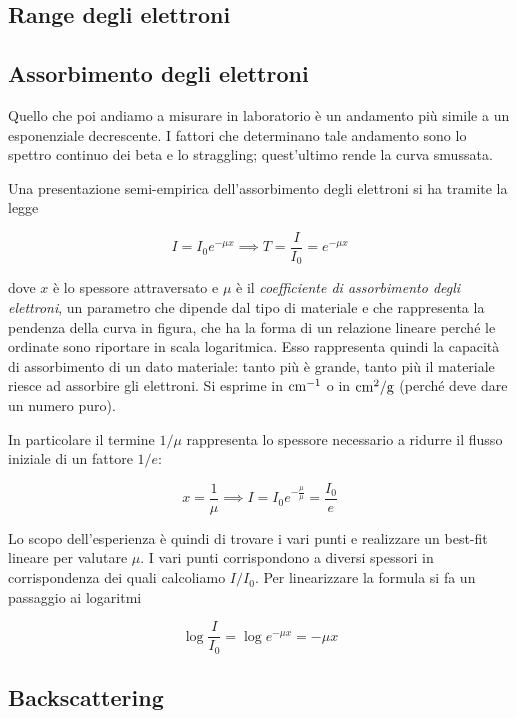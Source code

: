 
\subsection{Range degli elettroni}

\subsection{Assorbimento degli elettroni}
Quello che poi andiamo a misurare in laboratorio è un andamento più simile a un esponenziale decrescente. I fattori che determinano tale andamento sono lo spettro continuo dei beta e lo straggling; quest'ultimo rende la curva smussata.

Una presentazione semi-empirica dell'assorbimento degli elettroni si ha tramite la legge

$$I=I_0 e^{-\mu x}
\implies
T=\frac{I}{I_0}=e^{-\mu x}$$

dove $x$ è lo spessore attraversato e $\mu$ è il \textit{coefficiente di assorbimento degli elettroni}, un parametro che dipende dal tipo di materiale e che rappresenta la pendenza della curva in figura, che ha la forma di un relazione lineare perché le ordinate sono riportare in scala logaritmica. Esso rappresenta quindi la capacità di assorbimento di un dato materiale: tanto più è grande, tanto più il materiale riesce ad assorbire gli elettroni. Si esprime in $\rm cm^{-1}$ o in $\rm cm^2/g$ (perché deve dare un numero puro).

In particolare il termine $1/\mu$ rappresenta lo spessore necessario a ridurre il flusso iniziale di un fattore $1/e$:

$$x=\frac{1}{\mu}
\implies
I=I_0 e^{-\frac{\mu}{\mu}}
=\frac{I_0}{e}
$$

Lo scopo dell'esperienza è quindi di trovare i vari punti e realizzare un best-fit lineare per valutare $\mu$. I vari punti corrispondono a diversi spessori in corrispondenza dei quali calcoliamo $I/I_0$. Per linearizzare la formula si fa un passaggio ai logaritmi

$$\log{\frac{I}{I_0}}
=\log{e^{-\mu x}}
=-\mu x$$

\subsection{Backscattering}

